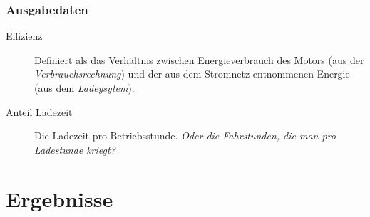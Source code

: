 \subsubsection{Ausgabedaten}
\begin{description}
	\item[Effizienz] Definiert als das Verhältnis zwischen Energieverbrauch des Motors (aus der \emph{Verbrauchsrechnung}) und der aus dem Stromnetz entnommenen Energie (aus dem \emph{Ladeysytem}).
	\item[Anteil Ladezeit] Die Ladezeit pro Betriebsstunde. \emph{Oder die Fahrstunden, die man pro Ladestunde kriegt?}
\end{description}

\section{Ergebnisse}